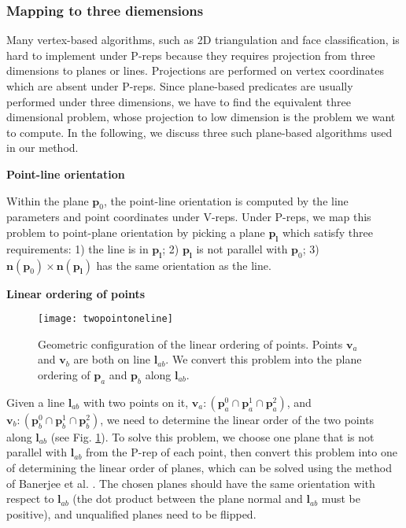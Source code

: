 \subsubsection{Mapping to three diemensions}

Many vertex-based algorithms, such as 2D triangulation and face classification, is hard to implement under P-reps because they requires projection from three dimensions to planes or lines.  Projections are performed on vertex coordinates which are absent under P-reps. Since plane-based predicates \cite{bernstein2009fast,banerjee1996topologically} are usually performed under three dimensions, we have to find the equivalent three dimensional problem, whose projection to low dimension is the problem we want to compute. In the following, we discuss three such plane-based algorithms used in our method.

\vspace{0.5em}
\noindent \textbf{Point-line orientation}

\noindent Within the plane $\bm{p}_0$, the point-line orientation is computed by the line parameters and point coordinates under V-reps. Under P-reps, we map this problem to point-plane orientation by picking a plane $\bm{p_l}$ which satisfy three requirements: 1) the line is in $\bm{p_l}$; 2) $\bm{p_l}$ is not parallel with $\bm{p}_0$; 3) $\bm{n}(\bm{p}_0) \times \bm{n}(\bm{p_l})$ has the same orientation as the line.

\vspace{0.5em}
\noindent \textbf{Linear ordering of points}

\begin{figure}
  \centering
  \texttt{[image: twopointoneline]}\\
  \caption{Geometric configuration of the linear ordering of points. Points $\bm{v}_a$ and $\bm{v}_b$ are both on line $\bm{l}_{ab}$. We convert this problem into the plane ordering of $\bm{p}_a$ and $\bm{p}_b$ along $\bm{l}_{ab}$.}\label{fig:twopointoneline}
\end{figure}

\noindent Given a line $\bm{l}_{ab}$ with two points on it, $\bm{v}_a\colon(\bm{p}_a^0\cap\bm{p}_a^1\cap\bm{p}_a^2)$, and $\bm{v}_b\colon(\bm{p}_b^0\cap\bm{p}_b^1\cap\bm{p}_b^2)$, we need to determine the linear order of the two points along $\bm{l}_{ab}$ (see Fig. \ref{fig:twopointoneline}).
To solve this problem, we choose one plane that is not parallel with $\bm{l}_{ab}$ from the P-rep of each point, then convert this problem into one of determining the linear order of planes, which can be solved using the method of Banerjee et al. \cite{banerjee1996topologically}. The chosen planes should have the same orientation with respect to $\bm{l}_{ab}$ (the dot product between the plane normal and $\bm{l}_{ab}$ must be positive), and unqualified planes need to be flipped.


